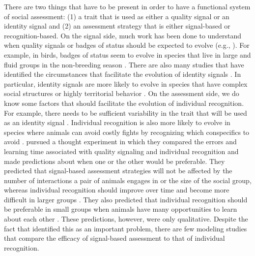 There are two things that have to be present in order to have a functional system of social assessment: (1) a trait that is used as either a quality signal or an identity signal and (2) an assessment strategy that is either signal-based or recognition-based.  On the signal side, much work has been done to understand when quality signals or badges of status should be expected to evolve (e.g., \citealp{Whitfield:1987tg,Rohwer:1975fk,Rohwer:1982fk,Dawkins:1991ly,Johnstone:1995vn,Lachmann:1998fk,Tibbetts:2009kx}). For example, in birds, badges of status seem to evolve in species that live in large and fluid groups in the non-breeding season \citep{Tibbetts:2009kx}. There are also many studies that have identified the circumstances that facilitate the evolution of identity signals \citep{Rohwer:1975fk,Whitfield:1987tg,Sheehan:2009we,Pollard:2011te,Sheehan:2014fk}. In particular, identity signals are more likely to evolve in species that have complex social structures or highly territorial behavior \citep{Tibbetts2007IndividualDifferent}. On the assessment side, we do know some factors that should facilitate the evolution of individual recognition. For example, there needs to be sufficient variability in the trait that will be used as an identity signal \citep{Sheehan:2014fk}. Individual recognition is also more likely to evolve in species where animals can avoid costly fights by recognizing which conspecifics to avoid \citep{DEttorre:2005nu}.  \citet{sheehan2016evotradeoff} pursued a thought experiment in which they compared the errors and learning time associated with quality signaling and individual recognition and made predictions about when one or the other would be preferable. They predicted that signal-based assessment strategies will not be affected by the number of interactions a pair of animals engages in or the size of the social group, whereas individual recognition should improve over time and become more difficult in larger groups \citep{sheehan2016evotradeoff}. They also predicted that individual recognition should be preferable in small groups when animals have many opportunities to learn about each other \citep{sheehan2016evotradeoff}. These predictions, however, were only qualitative. Despite the fact that \citet{sheehan2016evotradeoff} identified this as an important problem, there are few modeling studies that compare the efficacy of signal-based assessment to that of individual recognition. 

